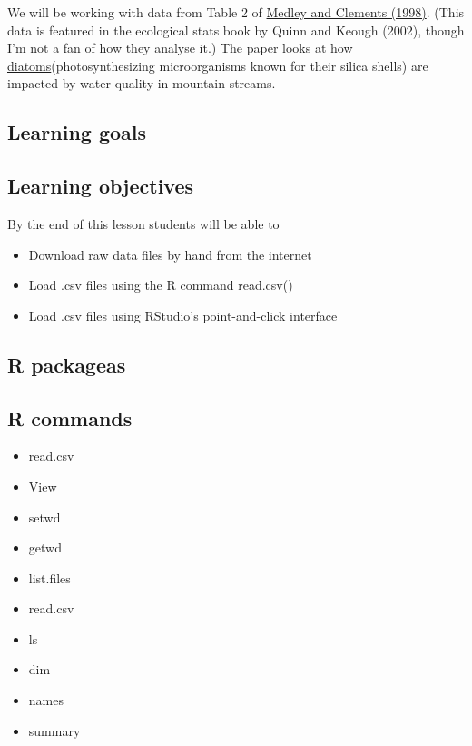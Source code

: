 \documentclass[]{book}
\providecommand{\tightlist}{%
  \setlength{\itemsep}{0pt}\setlength{\parskip}{0pt}}
\theoremstyle{definition}
\theoremstyle{definition}
\theoremstyle{definition}
\theoremstyle{remark}
\begin{document}
We will be working with data from Table 2 of
\href{https://www.jstor.org/stable/2641255}{Medley and Clements (1998)}.
(This data is featured in the ecological stats book by Quinn and Keough
(2002), though I'm not a fan of how they analyse it.) The paper looks at
how
\href{https://en.wikipedia.org/wiki/Diatom}{diatoms}(photosynthesizing
microorganisms known for their silica shells) are impacted by water
quality in mountain streams.

\subsection{Learning goals}\label{learning-goals-2}

\subsection{Learning objectives}\label{learning-objectives-2}

By the end of this lesson students will be able to

\begin{itemize}
\tightlist
\item
  Download raw data files by hand from the internet
\item
  Load .csv files using the R command read.csv()
\item
  Load .csv files using RStudio's point-and-click interface
\end{itemize}

\subsection{R packageas}\label{r-packageas}

\subsection{R commands}\label{r-commands-1}

\begin{itemize}
\tightlist
\item
  read.csv
\item
  View
\item
  setwd
\item
  getwd
\item
  list.files
\item
  read.csv
\item
  ls
\item
  dim
\item
  names
\item
  summary
\end{itemize}
\end{document}
